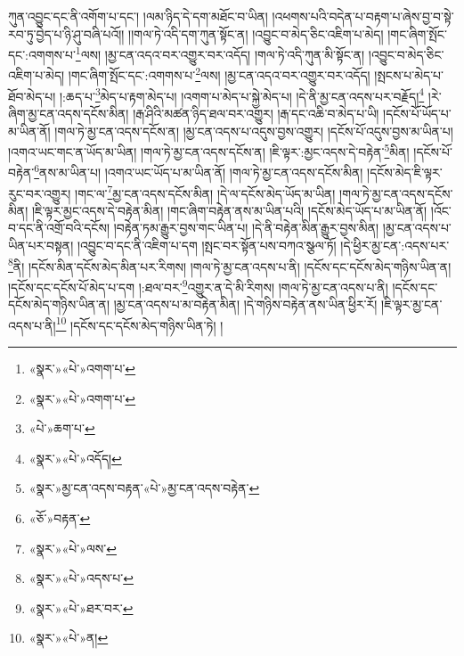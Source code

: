 ཀུན་འབྱུང་དང་ནི་འགོག་པ་དང་། །ལམ་ཉིད་དེ་དག་མཐོང་བ་ཡིན། །འཕགས་པའི་བདེན་པ་བརྟག་པ་ཞེས་བྱ་བ་སྟེ་རབ་ཏུ་བྱེད་པ་ཉི་ཤུ་བཞི་པའོ།། །།གལ་ཏེ་འདི་དག་ཀུན་སྟོང་ན། །འབྱུང་བ་མེད་ཅིང་འཇིག་པ་མེད། །གང་ཞིག་སྤོང་དང་:འགགས་པ་\footnote{«སྣར་»«པེ་»འགག་པ་}ལས། །མྱ་ངན་འདའ་བར་འགྱུར་བར་འདོད། །གལ་ཏེ་འདི་ཀུན་མི་སྟོང་ན། །འབྱུང་བ་མེད་ཅིང་འཇིག་པ་མེད། །གང་ཞིག་སྤོང་དང་:འགགས་པ་\footnote{«སྣར་»«པེ་»འགག་པ་}ལས། །མྱ་ངན་འདའ་བར་འགྱུར་བར་འདོད། །སྤངས་པ་མེད་པ་ཐོབ་མེད་པ། །:ཆད་པ་\footnote{«པེ་»ཆག་པ་}མེད་པ་རྟག་མེད་པ། །འགག་པ་མེད་པ་སྐྱེ་མེད་པ། །དེ་ནི་མྱ་ངན་འདས་པར་བརྗོད།\footnote{«སྣར་»«པེ་»འདོད།} །རེ་ཞིག་མྱ་ངན་འདས་དངོས་མིན། །རྒ་ཤིའི་མཚན་ཉིད་ཐལ་བར་འགྱུར། །རྒ་དང་འཆི་བ་མེད་པ་ཡི། །དངོས་པོ་ཡོད་པ་མ་ཡིན་ནོ། །གལ་ཏེ་མྱ་ངན་འདས་དངོས་ན། །མྱ་ངན་འདས་པ་འདུས་བྱས་འགྱུར། །དངོས་པོ་འདུས་བྱས་མ་ཡིན་པ། །འགའ་ཡང་གང་ན་ཡོད་མ་ཡིན། །གལ་ཏེ་མྱ་ངན་འདས་དངོས་ན། །ཇི་ལྟར་:མྱང་འདས་དེ་བརྟེན་\footnote{«སྣར་»མྱ་ངན་འདས་བརྟན་«པེ་»མྱ་ངན་འདས་བརྟེན་}མིན། །དངོས་པོ་བརྟེན་\footnote{«ཅོ་»བརྟན་}ནས་མ་ཡིན་པ། །འགའ་ཡང་ཡོད་པ་མ་ཡིན་ནོ། །གལ་ཏེ་མྱ་ངན་འདས་དངོས་མིན། །དངོས་མེད་ཇི་ལྟར་རུང་བར་འགྱུར། །གང་ལ་\footnote{«སྣར་»«པེ་»ལས་}མྱ་ངན་འདས་དངོས་མིན། །དེ་ལ་དངོས་མེད་ཡོད་མ་ཡིན། །གལ་ཏེ་མྱ་ངན་འདས་དངོས་མིན། །ཇི་ལྟར་མྱང་འདས་དེ་བརྟེན་མིན། །གང་ཞིག་བརྟེན་ནས་མ་ཡིན་པའི། །དངོས་མེད་ཡོད་པ་མ་ཡིན་ནོ། །འོང་བ་དང་ནི་འགྲོ་བའི་དངོས། །བརྟེན་ཏམ་རྒྱུར་བྱས་གང་ཡིན་པ། །དེ་ནི་བརྟེན་མིན་རྒྱུར་བྱས་མིན། །མྱ་ངན་འདས་པ་ཡིན་པར་བསྟན། །འབྱུང་བ་དང་ནི་འཇིག་པ་དག །སྤང་བར་སྟོན་པས་བཀའ་སྩལ་ཏོ། །དེ་ཕྱིར་མྱ་ངན་:འདས་པར་\footnote{«སྣར་»«པེ་»འདས་པ་}ནི། །དངོས་མིན་དངོས་མེད་མིན་པར་རིགས། །གལ་ཏེ་མྱ་ངན་འདས་པ་ནི། །དངོས་དང་དངོས་མེད་གཉིས་ཡིན་ན། །དངོས་དང་དངོས་པོ་མེད་པ་དག །:ཐལ་བར་\footnote{«སྣར་»«པེ་»ཐར་བར་}འགྱུར་ན་དེ་མི་རིགས། །གལ་ཏེ་མྱ་ངན་འདས་པ་ནི། །དངོས་དང་དངོས་མེད་གཉིས་ཡིན་ན། །མྱ་ངན་འདས་པ་མ་བརྟེན་མིན། །དེ་གཉིས་བརྟེན་ནས་ཡིན་ཕྱིར་རོ། །ཇི་ལྟར་མྱ་ངན་འདས་པ་ནི།\footnote{«སྣར་»«པེ་»ན།} །དངོས་དང་དངོས་མེད་གཉིས་ཡིན་ཏེ། །
